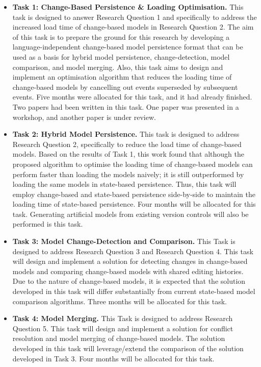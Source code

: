 \documentclass[12pt, a4paper]{report} \usepackage[titletoc]{appendix}
\begin{document}
\begin{itemize}
    \item \textbf{Task 1: Change-Based Persistence \& Loading Optimisation.} This task is designed to answer Research Question 1 and specifically to address the increased load time of change-based models in Research Question 2. The aim of this task is to prepare the ground for this research by developing a language-independent change-based model persistence format that can be used as a basis for hybrid model persistence, change-detection, model comparison, and model merging. Also, this task aims to design and implement an optimisation algorithm that reduces the loading time of change-based models by cancelling out events superseded by subsequent events. Five months were allocated for this task, and it had already finished. Two papers had been written in this task. One paper was presented in a workshop, and another paper is under review. 
    \item \textbf{Task 2: Hybrid Model Persistence.} This task is designed to address Research Question 2, specifically to reduce the load time of change-based models.  Based on the results of Task 1, this work found that although the proposed algorithm to optimise the loading time of change-based models can perform faster than loading the models naively; it is still outperformed by loading the same models in state-based persistence. Thus, this task will employ change-based and state-based persistence side-by-side to maintain the loading time of state-based persistence. Four months will be allocated for this task. Generating artificial models from existing version controls will also be performed is this task.  
    \item \textbf{Task 3: Model Change-Detection and Comparison.} This Task is designed to address Research Question 3 and Research Question 4. This task will design and implement a solution for detecting changes in change-based models and comparing change-based models with shared editing histories. Due to the nature of change-based models, it is expected that the solution developed in this task will differ substantially from current state-based model comparison algorithms. Three months will be allocated for this task.  
    \item \textbf{Task 4: Model Merging.} This Task is designed to address Research Question 5. This task will design and implement a solution for conflict resolution and model merging of change-based models. The solution developed in this task will leverage/extend the comparison of the solution developed in Task 3. Four months will be allocated for this task. 

\end{itemize}
\end{document}
